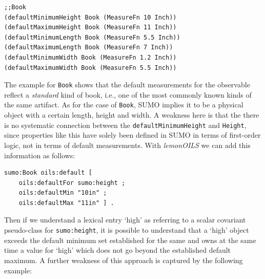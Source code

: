 \documentclass[11pt]{article}
\begin{document}
\begin{small}\begin{verbatim}
;;Book
(defaultMinimumHeight Book (MeasureFn 10 Inch))
(defaultMaximumHeight Book (MeasureFn 11 Inch))
(defaultMinimumLength Book (MeasureFn 5.5 Inch))
(defaultMaximumLength Book (MeasureFn 7 Inch))
(defaultMinimumWidth Book (MeasureFn 1.2 Inch))
(defaultMaximumWidth Book (MeasureFn 5.5 Inch))
\end{verbatim}\end{small}

The example for \texttt{Book} shows that the default measurements for the observable reflect a \textit{standard} kind of book,
i.e., one of the most commonly known kinds of the same artifact. As for the case of \texttt{Book}, SUMO implies it to be a physical object with a certain length, height and width. 
A weakness here is that the there is no systematic connection between the {\tt defaultMinimumHeight} and {\tt Height}, since properties like this have solely been defined in SUMO in terms of first-order logic, not in terms of default measurements. With \emph{lemonOILS} we can add this information as follows:

\begin{small}\begin{verbatim}
sumo:Book oils:default [
    oils:defaultFor sumo:height ;
    oils:defaultMin "10in" ;
    oils:defaultMax "11in" ] .
\end{verbatim}\end{small}

Then if we understand a lexical entry `high' as referring to a scalar covariant pseudo-class for {\tt sumo:height},
it is possible to understand that a `high' object exceeds the default minimum set established for the same and owns at the same time a value for `high' which does not go beyond the established default maximum. %
A further weakness of this approach is captured by the following example:
\end{document}
